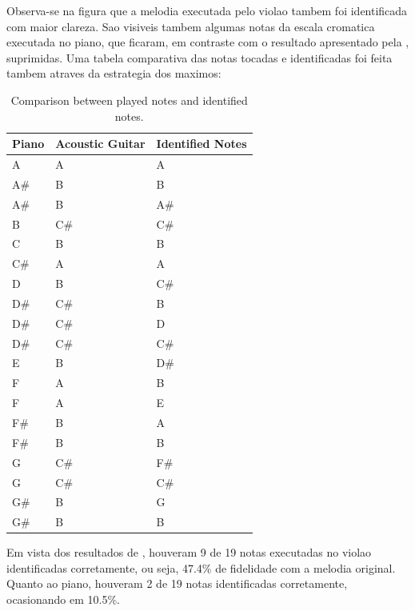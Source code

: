 \documentclass{article}
\begin{document}
	Observa-se na figura  que a melodia executada pelo violao tambem foi identificada com maior clareza. Sao visiveis tambem algumas notas da escala cromatica executada no piano, que ficaram, em contraste com o resultado apresentado pela , suprimidas. Uma tabela comparativa das notas tocadas e identificadas foi feita tambem atraves da estrategia dos maximos:

	\begin{table}[h]
	 \begin{center}
	 \begin{tabular}{|l|l|l|}
	  \hline
	  Piano & Acoustic Guitar & Identified Notes \\
	  \hline
			  A & A &  A \\
		A\# &  B &  B \\
		    A\# &  B &    A\# \\
		    B  &   C\# &  C\# \\
		    C   &  B  &   B \\
		    C\# &  A   &  A \\
		    D   &  B   &  C\# \\
		    D\# &  C\# &  B \\
		    D\# &  C\# &  D \\
		    D\# &  C\# &  C\# \\
		    E   &  B  &   D\# \\
		    F   &  A   &  B \\
		    F   &  A  &   E \\
		    F\# &  B  &   A \\
		    F\# &  B   &  B \\
		    G   &  C\# &  F\# \\
		    G   &  C\# &  C\# \\
		    G\# &  B   &  G \\
		    G\# &  B  &   B \\
	  \hline
	 \end{tabular}
	\end{center}
	 \caption{Comparison between played notes and identified notes.}
	 \label{tab:table-2-ccm-violao}
	\end{table}

	\newpage
	Em vista dos resultados de , houveram 9 de 19 notas executadas no violao identificadas corretamente, ou seja, 47.4\% de fidelidade com a melodia original. Quanto ao piano, houveram 2 de 19 notas identificadas corretamente, ocasionando em 10.5\%.
\end{document}
